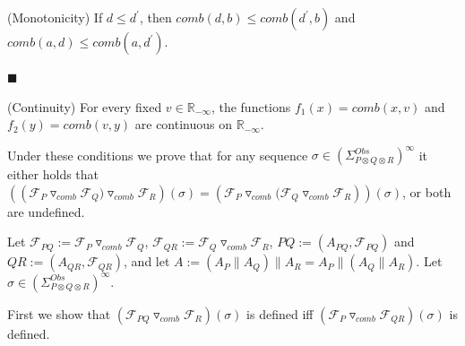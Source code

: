 \documentclass[10pt,a4paper]{article}
\begin{document}
(Monotonicity) If $d\leq d^{\prime}$, then $\mathit{comb}(d,b)\leq\mathit{comb}(d^{\prime},b)$ and $\mathit{comb}(a,d)\leq\mathit{comb}(a,d^{\prime})$.\par
 
 
 
\par\noindent  $\blacksquare$ 
 
(Continuity) For every fixed $v\in\mathbb{R}_{-\infty}$, the functions $f_{1}(x)=\mathit{comb}(x,v)$ and $f_{2}(y)=\mathit{comb}(v,y)$ are continuous on $\mathbb{R}_{-\infty}$.\par
 
 
  
 
 
Under these conditions we prove that for any sequence $\sigma\in(\Sigma_{P\otimes Q\otimes R}^{Obs})^{\infty}$ it either holds that $(({{{{\mathcal{F}_{P}}\mathbin{\triangledown_{\mathit{comb}}}{\mathcal{F}_{Q})}}}\mathbin{\triangledown_{\mathit{comb}}}{\mathcal{F}_{R}}})(\sigma)=({{\mathcal{F}_{P}}\mathbin{\triangledown_{\mathit{comb}}}{{{(\mathcal{F}_{Q}}\mathbin{\triangledown_{\mathit{comb}}}{\mathcal{F}_{R}}}}}))(\sigma)$, or both are undefined.\par
 
 
 
Let $\mathcal{F}_{PQ}:={{\mathcal{F}_{P}}\mathbin{\triangledown_{\mathit{comb}}}{\mathcal{F}_{Q}}}$, $\mathcal{F}_{QR}:={{\mathcal{F}_{Q}}\mathbin{\triangledown_{\mathit{comb}}}{\mathcal{F}_{R}}}$, $PQ:=(A_{PQ},\mathcal{F}_{PQ})$ and $QR:=(A_{QR},\mathcal{F}_{QR})$, and let $A:=(A_{P}\parallel A_{Q})\parallel A_{R}=A_{P}\parallel(A_{Q}\parallel A_{R})$. Let $\sigma\in(\Sigma_{P\otimes Q\otimes R}^{Obs})^{\infty}$.\par
 
 
 
First we show that $({{\mathcal{F}_{PQ}}\mathbin{\triangledown_{\mathit{comb}}}{\mathcal{F}_{R}}})(\sigma)$ is defined iff $({{\mathcal{F}_{P}}\mathbin{\triangledown_{\mathit{comb}}}{\mathcal{F}_{QR}}})(\sigma)$ is defined.\par
 
 
\end{document}
